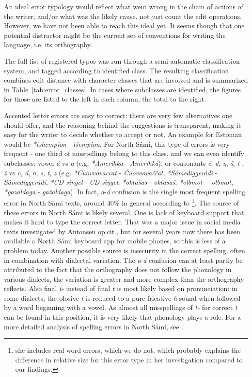 \documentclass{flammie}
\newcommand{\samit}{\mbox{t\hspace{-.35em}-}} %
\begin{document}
An ideal error typology would reflect what went wrong in the chain of actions of
the writer, and/or what was the likely cause, not just count the edit
operations. However, we have not been able to reach this ideal yet. It seems
though that one potential distractor might be the current set of conventions for
writing the language, i.e. its orthography.

The full list of registered typos was run through a semi-automatic
classification system, and tagged according to identified class. The resulting
classification combines edit distance with character classes that are involved
and is summarized in Table~\ref{tab:error_classes}. In cases where subclasses
are identified, the figures for those are listed to the left in each column, the
total to the right.

Accented letter errors are easy to correct: there are very few alternatives one
should offer, and the reasoning behind the suggestions is transparent, making it
easy for the writer to decide whether to accept or not. An example for Estonian
would be \textit{*tshempion} - \textit{tšempion}. For North Sámi, this type of
errors is very frequent - one third of misspellings belong to this class, and we
can even identify subclasses: vowel \textit{á} vs \textit{a} (e.g.
\textit{*Amerihka} - \textit{Amerihká}), or consonants \textit{č}, \textit{đ},
\textit{ŋ}, \textit{š}, \textit{\samit}, \textit{ž} vs \textit{c}, \textit{d},
\textit{n}, \textit{s}, \textit{t}, \textit{z} (e.g. \textit{*Cuovvovaccat} -
\textit{Čuovvovaččat}, \textit{*Sámediggerádi} - \textit{Sámediggeráđi},
\textit{*CD-singel} - \textit{CD-siŋgel}, \textit{*oktašas} - \textit{oktasaš},
\textit{*olbmo\samit} - \textit{olbmot}, \textit{*gazaldaga} -
\textit{gažaldaga}). In fact, \textit{a}-\textit{á} confusion is the single most
frequent spelling error in North Sámi texts, around 40\% in general according to
\cite[p 24]{antonsen2013}\footnote{she includes real-word errors, which we do
not, which probably explains the difference in relative size for this error type
in her investigation compared to our findings.}.  The source of these errors in
North Sámi is likely several. One is lack of keyboard support that makes it hard
to type the correct letter. That was a major issue in social media texts
investigated by Antonsen op.cit., but for several years now there has been
available a North Sámi keyboard app for mobile phones, so this is less of a
problem today. Another possible source is insecurity in the correct spelling,
often in combination with dialectal variation. The \textit{a}-\textit{á}
confusion can at least partly be attributed to the fact that the orthography
does not follow the phonology in various dialects, the variation is greater and
more complex than the orthography reflects. Also final \textit{\samit} instead
of final \textit{t} is most likely based on pronunciation: in some dialects, the
plosive \textit{t} is reduced to a pure fricative \textit{h} sound when followed
by a word beginning with a vowel. As almost all misspellings of \textit{\samit}
for correct \textit{t} can be found in this position, it is very likely that
phonology plays a role. For a more detailed analysis of spelling errors in North
Sámi, see \cite{antonsen2013}.
\end{document}
